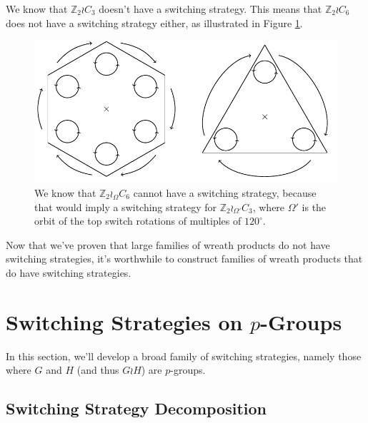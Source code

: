 \begin{example}
  We know that $\mathbb Z_2 \wr C_3$ doesn't have a switching strategy.
  This means that $\mathbb Z_2 \wr C_6$ does not have a switching strategy either,
  as illustrated in Figure \ref{fig:Z2C6_2}.
\end{example}
\begin{figure}
  \center
  \includegraphics{assets/tikz_Z2C6_2.pdf}
  \caption{We know that $\mathbb Z_2 \wr_\Omega C_6$ cannot have
  a switching strategy, because that would imply a switching strategy for
  $\mathbb Z_2 \wr_{\Omega'} C_3$, where $\Omega'$
  is the orbit of the top switch rotations of multiples of $120^\circ$.}
  \label{fig:Z2C6_2}
\end{figure}

Now that we've proven that large families of wreath products do not have
switching strategies, it's worthwhile to construct families of wreath products
that do have switching strategies.
%
%
\section{Switching Strategies on \texorpdfstring{$p$}{p}-Groups}
\label{sec:pGroupStrategy}
In this section, we'll develop a broad family of switching strategies,
namely those where $G$ and $H$ (and thus $G \wr H$) are $p$-groups.
\subsection{Switching Strategy Decomposition}

